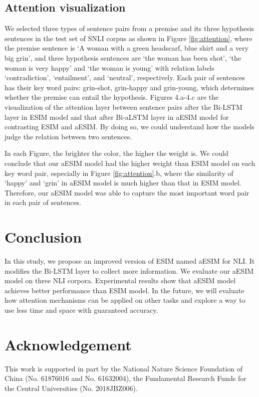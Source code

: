 \documentclass[10pt,sigconf]{acmart}
\begin{document}
\subsection{Attention visualization}
We selected three types of sentence pairs from a premise and its three hypothesis sentences in the test set of SNLI corpus as shown in Figure \ref{fig:attention}, where the premise sentence is ‘A woman with a green headscarf, blue shirt and a very big grin’, and three hypothesis sentences are ‘the woman has been shot’, ‘the woman is very happy’ and ‘the woman is young’ with relation labels ‘contradiction’, ‘entailment’, and ‘neutral’, respectively. Each pair of sentences has their key word pairs: grin-shot, grin-happy and grin-young, which determines whether the premise can entail the hypothesis. Figures 4.a-4.c are the visualization of the attention layer between sentence pairs after the Bi-LSTM layer in ESIM model and that after Bi-aLSTM layer in aESIM model for contrasting ESIM and aESIM. By doing so, we could understand how the models judge the relation between two sentences.

In each Figure, the brighter the color, the higher the weight is. We could conclude that our aESIM model had the higher weight than ESIM model on each key word pair, especially in Figure \ref{fig:attention}.b, where the similarity of ‘happy’ and ‘grin’ in aESIM model is much higher than that in ESIM model. Therefore, our aESIM model was able to capture the most important word pair in each pair of sentences.

\section{Conclusion}
In this study, we propose an improved version of ESIM named aESIM for NLI. It modifies the Bi-LSTM layer to collect more information. We evaluate our aESIM model on three NLI corpora. Experimental results show that aESIM model achieves better performance than ESIM model. In the future, we will evaluate how attention mechanisms can be applied on other tasks and explore a way to use less time and space with guaranteed accuracy.

\section*{Acknowledgement}
This work is supported in part by the National Nature Science Foundation of China (No. 61876016 and No. 61632004), the Fundamental Research Funds for the Central Universities (No. 2018JBZ006).






\end{document}

